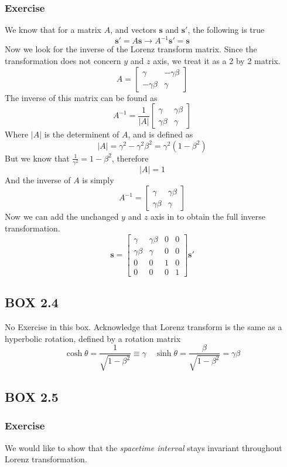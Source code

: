 \documentclass[12pt]{article}
\newcommand{\paren}[1]{\left( #1 \right)}
\newcommand{\abso}[1]{\left|#1 \right|}
\newcommand{\then}{\rightarrow}
\begin{document}
\subsubsection{Exercise}
We know that for a matrix $A$, and vectors $\mathbf{s}$ and $\mathbf{s}'$, the following is true
\[
\mathbf{s}' = A\mathbf{s} \then A^{-1}\mathbf{s}'=\mathbf{s}
\]
Now we look for the inverse of the Lorenz transform matrix. Since the transformation does not concern $y$ and $z$ axis, we treat it as a 2 by 2 matrix.
\[
A = \begin{bmatrix}
    \gamma & -\gamma\beta\\
    -\gamma\beta & \gamma
\end{bmatrix}
\]
The inverse of this matrix can be found as
\[
A^{-1} = \frac{1}{\abso{A}}\begin{bmatrix}
    \gamma & \gamma\beta\\
    \gamma\beta & \gamma
\end{bmatrix}
\]
Where $\abso{A}$ is the determinent of $A$, and is defined as
\[
\abso{A} = \gamma^2 -\gamma^2\beta^2 = \gamma^2\paren{1-\beta^2}
\]
But we know that $\frac{1}{\gamma^2} = 1 - \beta^2$, therefore
\[
\abso{A} = 1
\]
And the inverse of $A$ is simply 
\[
A^{-1} =\begin{bmatrix}
    \gamma & \gamma\beta\\
    \gamma\beta & \gamma
\end{bmatrix}
\]
Now we can add the unchanged $y$ and $z$ axis in to obtain the full inverse transformation.
\[
\mathbf{s} = \begin{bmatrix}
    \gamma & \gamma\beta & 0 & 0\\
    \gamma\beta & \gamma & 0 & 0\\
    0&0&1&0\\
    0&0&0&1
\end{bmatrix}\mathbf{s}'
\]

\subsection{BOX 2.4}
No Exercise in this box. Acknowledge that Lorenz transform is the same as a hyperbolic rotation, defined by a rotation matrix
\[
\cosh\theta = \frac{1}{\sqrt{1-\beta^2}} \equiv \gamma \quad \sinh\theta = \frac{\beta}{\sqrt{1-\beta^2}}=\gamma \beta
\]

\subsection{BOX 2.5}
\subsubsection{Exercise}
We would like to show that the \textit{spacetime interval} stays invariant throughout Lorenz transformation. 
\end{document}
